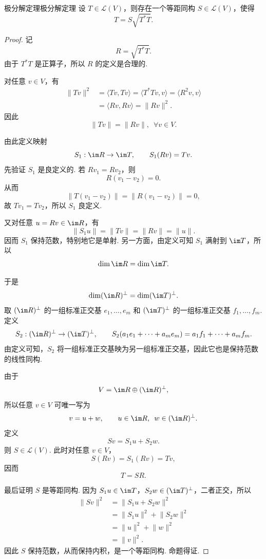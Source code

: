 \begin{theorem}{极分解定理}{极分解定理} 
    设 $ T \in \mathcal{L}(V) $，则存在一个等距同构 $ S \in \mathcal{L}(V) $，使得
    \[
        T = S\sqrt{T^*T}.
    \]
\end{theorem}

\begin{proof}
    记
    \[
        R = \sqrt{T^*T}.
    \]
    由于 $ T^*T $ 是正算子，所以 $ R $ 的定义是合理的.

    对任意 $ v \in V $，有
    \begin{align*}
        \lVert Tv \rVert^2
         & = \langle Tv, Tv \rangle
          = \langle T^*Tv, v \rangle
          = \langle R^2v, v \rangle  \\
         & = \langle Rv, Rv \rangle
          = \lVert Rv \rVert^2.
    \end{align*}
    因此
    \[
        \lVert Tv \rVert = \lVert Rv \rVert,\enspace \forall v \in V.
    \]

    由此定义映射
    \[
        S_1 : \im R \to \im T,\qquad S_1(Rv) = Tv.
    \]
    先验证 $ S_1 $ 是良定义的. 若 $ Rv_1 = Rv_2 $，则
    \[
        R(v_1-v_2)=0.
    \]
    从而
    \[
        \lVert T(v_1-v_2) \rVert = \lVert R(v_1-v_2) \rVert = 0,
    \]
    故 $ Tv_1 = Tv_2 $，所以 $ S_1 $ 良定义.

    又对任意 $ u = Rv \in \im R $，有
    \[
        \lVert S_1u \rVert = \lVert Tv \rVert = \lVert Rv \rVert = \lVert u \rVert.
    \]
    因而 $ S_1 $ 保持范数，特别地它是单射. 另一方面，由定义可知 $ S_1 $ 满射到 $ \im T $，所以
    \[
        \dim \im R = \dim \im T.
    \]

    于是
    \[
        \dim (\im R)^\perp = \dim (\im T)^\perp.
    \]
    取 $ (\im R)^\perp $ 的一组标准正交基 $ e_1, \ldots, e_m $ 和 $ (\im T)^\perp $ 的一组标准正交基 $ f_1, \ldots, f_m $. 定义
    \[
        S_2 : (\im R)^\perp \to (\im T)^\perp,\qquad
        S_2(a_1e_1 + \cdots + a_me_m) = a_1f_1 + \cdots + a_mf_m.
    \]
    由定义可知，$ S_2 $ 将一组标准正交基映为另一组标准正交基，因此它也是保持范数的线性同构.

    由于
    \[
        V = \im R \oplus (\im R)^\perp,
    \]
    所以任意 $ v \in V $ 可唯一写为
    \[
        v = u + w,\qquad u \in \im R,\enspace w \in (\im R)^\perp.
    \]
    定义
    \[
        Sv = S_1u + S_2w.
    \]
    则 $ S \in \mathcal{L}(V) $. 此时对任意 $ v \in V $，
    \[
        S(Rv) = S_1(Rv) = Tv,
    \]
    因而
    \[
        T = SR.
    \]

    最后证明 $ S $ 是等距同构. 因为 $ S_1u \in \im T $，$ S_2w \in (\im T)^\perp $，二者正交，所以
    \begin{align*}
        \lVert Sv \rVert^2
         & = \lVert S_1u + S_2w \rVert^2 \\
         & = \lVert S_1u \rVert^2 + \lVert S_2w \rVert^2 \\
         & = \lVert u \rVert^2 + \lVert w \rVert^2 \\
         & = \lVert v \rVert^2.
    \end{align*}
    因此 $ S $ 保持范数，从而保持内积，是一个等距同构. 命题得证.
\end{proof}

